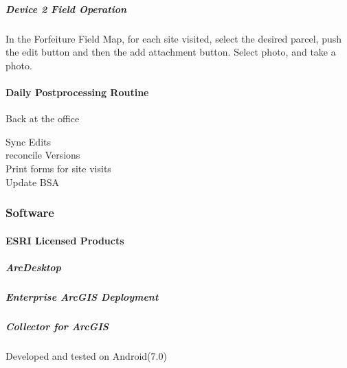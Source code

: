 \documentclass[class=article , crop=false, titlepage, twoside, multi={itemize, figure, verbatim}, float=false]{standalone}
\begin{document}
%
%


\subparagraph{Device 2 Field Operation}In the Forfeiture Field Map, for each site visited, select the desired parcel, push the edit button and then the add attachment button.  Select photo, and take a photo.

\paragraph{Daily Postprocessing Routine}Back at the office

\begin{description}
\item [Sync Edits] \blindtext
\item [reconcile Versions] \blindtext
\item[Print forms for site visits] \blindtext
\item[Update BSA] \blindtext
\end{description}

\clearpage
\subsubsection{Software}
\paragraph{ESRI Licensed Products}
\subparagraph{ArcDesktop}

\subparagraph{Enterprise ArcGIS Deployment}

\subparagraph{Collector for ArcGIS}Developed and tested on Android(7.0)
\end{document}
